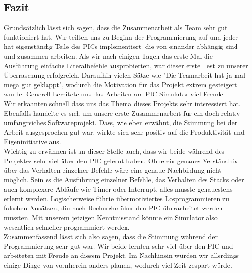 \documentclass[
10pt, %
a4paper, %
oneside, %
headinclude,footinclude, %
BCOR5mm, %
]{scrartcl}
\begin{document}
	\subsection{Fazit}
		Grundsätzlich lässt sich sagen, dass die Zusammenarbeit als Team sehr gut funktioniert hat. Wir teilten uns zu Beginn der Programmierung auf und jeder hat eigenständig Teile des PICs implementiert, die von einander abhängig sind und zusammen arbeiten. Als wir nach einigen Tagen das erste Mal die Ausführung einfache Literalbefehle ausprobierten, war dieser erste Test zu unserer Überraschung erfolgreich. Daraufhin vielen Sätze wie "Die Teamarbeit hat ja mal mega gut geklappt", wodurch die Motivation für das Projekt extrem gesteigert wurde. Generell bereitete uns das Arbeiten am PIC-Simulator viel Freude.\\
		Wir erkannten schnell dass uns das Thema dieses Projekts sehr interessiert hat. Ebenfalls handelte es sich um unsere erste Zusammenarbeit für ein doch relativ umfangreiches Softwareprojekt. Dass, wie eben erwähnt, die Stimmung bei der Arbeit ausgesprochen gut war, wirkte sich sehr positiv auf die Produktivität und Eigeninitiative aus.\\
		Wichtig zu erwähnen ist an dieser Stelle auch, dass wir beide während des Projektes sehr viel über den PIC gelernt haben. Ohne ein genaues Verständnis über das Verhalten einzelner Befehle wäre eine genaue Nachbildung nicht möglich. Sein es die Ausführung einzelner Befehle, das Verhalten des Stacks oder auch komplexere Abläufe wie Timer oder Interrupt, alles musste genauestens erlernt werden. Logischerweise führte übermotiviertes Losprogrammieren zu falschen Ansätzen, die nach Recherche über den PIC überarbeitet werden mussten. Mit unserem jetzigen Kenntnisstand könnte ein Simulator also wesentlich schneller programmiert werden. \\
		Zusammenfassend lässt sich also sagen, dass die Stimmung während der Programmierung sehr gut war. Wir beide lernten sehr viel über den PIC und arbeiteten mit Freude an diesem Projekt. Im Nachhinein würden wir allerdings einige Dinge von vornherein anders planen, wodurch viel Zeit gespart würde.



\renewcommand{\refname}{\spacedlowsmallcaps{References}} %




\end{document}
